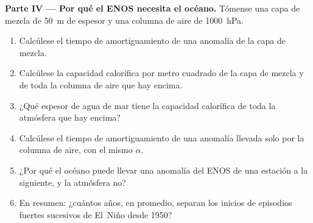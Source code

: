 \begin{problem}
\medskip\noindent\textbf{Parte IV --- Por qué el ENOS necesita el océano.}
Tómense una capa de mezcla de \qty{50}{m} de espesor y una columna de aire de \qty{1000}{hPa}.
\begin{enumerate}[resume]
  \item Calcúlese el tiempo de amortiguamiento de una anomalía de la capa de mezcla.
  \item Calcúlese la capacidad calorífica por metro cuadrado de la capa de mezcla y de toda la columna
        de aire que hay encima.
  \item ¿Qué espesor de agua de mar tiene la capacidad calorífica de toda la atmósfera que hay encima?
  \item Calcúlese el tiempo de amortiguamiento de una anomalía llevada solo por la columna de aire, con el mismo
        $\alpha$.
  \item ¿Por qué el océano puede llevar una anomalía del ENOS de una estación a la siguiente, y la
        atmósfera no?
  \item En resumen: ¿cuántos años, en promedio, separan los inicios de episodios fuertes sucesivos de El~Niño
        desde 1950?
\end{enumerate}
\end{problem}

